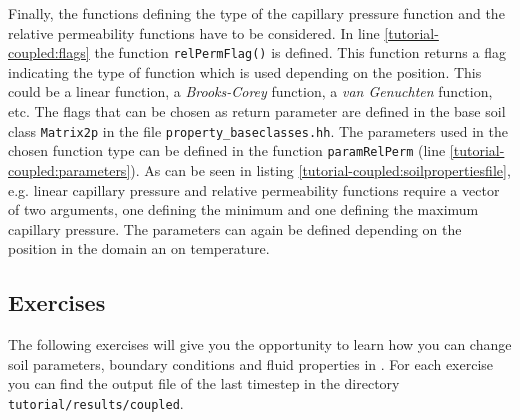 Finally, the functions defining the type of the capillary pressure
function and the relative permeability functions have to be
considered. In line \ref{tutorial-coupled:flags} the function
\texttt{relPermFlag()} is defined. This function returns a flag
indicating the type of function which is used depending on the
position. This could be a linear function, a \textit{Brooks-Corey}
function, a \textit{van Genuchten} function, etc. The flags that can
be chosen as return parameter are defined in the base soil class
\texttt{Matrix2p} in the file \texttt{property\_baseclasses.hh}. The
parameters used in the chosen function type can be defined in the
function \texttt{paramRelPerm} (line
\ref{tutorial-coupled:parameters}). As can be seen in listing
\ref{tutorial-coupled:soilpropertiesfile}, e.g. linear capillary
pressure and relative permeability functions require a vector of two
arguments, one defining the minimum and one defining the maximum
capillary pressure. The parameters can again be defined depending on
the position in the domain an on temperature.

\subsection{Exercises}
\label{tutorial-coupled:exercises}
The following exercises will give you the opportunity to learn how you
can change soil parameters, boundary conditions and fluid properties
in \Dumux. For each exercise you can find the output file of the last
timestep in the directory \texttt{tutorial/results/coupled}.


